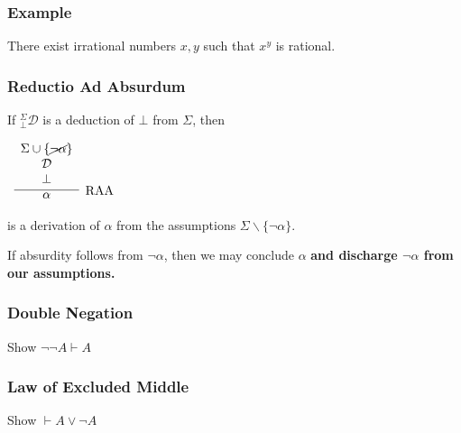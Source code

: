 \documentclass{beamer}
\begin{document}
\begin{frame}
	\frametitle{Example}

	There exist irrational numbers $x,y$ such that $x^{y}$ is rational.

	\vspace{70mm}

\end{frame}

\begin{frame}
	\frametitle{Reductio Ad Absurdum}
	
	If $^{\Sigma}_{\bot}\mathcal{D}$ is a deduction of $\bot$ from $\Sigma$, then
	
	\begin{center}		
		$\begin{array}{c}		
		\infer[\RAA]{\alpha}
		{\begin{array}{c} \Sigma \cup \{\cancel{\lnot\alpha}\} \\ \mathcal{D} \\ \bot \end{array}}
		\end{array}$
	\end{center}
	
	is a derivation of $\alpha$ from the assumptions $\Sigma \backslash\{\lnot\alpha\}$.
	
	\vspace{0.5cm}
	
	If absurdity follows from $\lnot\alpha$, then we may conclude $\alpha$ {\bf and discharge $\lnot \alpha$ from our assumptions.}
	 
\end{frame}

\begin{frame}
	\frametitle{Double Negation}	
	
	Show $\lnot\lnot A \vdash A$
	\vspace{7cm}	
	
\end{frame}

\begin{frame}
	\frametitle{Law of Excluded Middle}
	
	Show $\vdash A \lor \lnot A$
	\vspace{7cm}
	
\end{frame}
\end{document}
